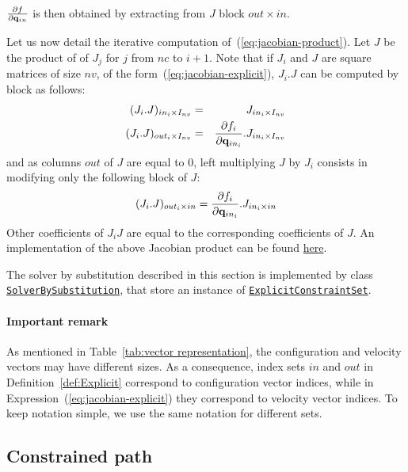 $\frac{\partial f}{\partial\mathbf{q}_{in}}$ is then obtained by extracting from $J$ block $out\times in$.

Let us now detail the iterative computation of~(\ref{eq:jacobian-product}). Let $J$ be the product of of $J_j$ for $j$ from $nc$ to $i+1$.
Note that if $J_i$ and $J$ are square matrices of size $nv$, of the form~(\ref{eq:jacobian-explicit}), $J_i.J$ can be computed by block as follows:
\begin{eqnarray*}
  (J_{i}.J)_{in_{i}\times I_{nv}} &=& J_{in_{i}\times I_{nv}}\\
  (J_{i}.J)_{out_{i}\times I_{nv}} &=& \frac{\partial f_i}{\partial\mathbf{q}_{in_{i}}}.J_{in_{i}\times I_{nv}}\\
\end{eqnarray*}
and as columns $out$ of $J$ are equal to $0$, left multiplying $J$ by $J_i$ consists in modifying only the following block of $J$:
$$
  (J_{i}.J)_{out_{i}\times in} = \frac{\partial f_i}{\partial\mathbf{q}_{in_{i}}}.J_{in_{i}\times {in}}\\
$$
Other coefficients of $J_{i}J$ are equal to the corresponding coefficients of $J$.
An implementation of the above Jacobian product can be found \href{https://github.com/humanoid-path-planner/hpp-constraints/blob/e21490c8c713949bd3038dccb6fe02cf254a615f/src/explicit-constraint-set.cc#L267}{here}.

The solver by substitution described in this section is implemented by class \href{https://gepettoweb.laas.fr/hpp/hpp-constraints/doxygen-html/classhpp_1_1constraints_1_1solver_1_1BySubstitution.html}{\texttt{SolverBySubstitution}}, that store an instance of \href{https://gepettoweb.laas.fr/hpp/hpp-constraints/doxygen-html/classhpp_1_1constraints_1_1ExplicitConstraintSet.html}{\texttt{ExplicitConstraintSet}}.

\paragraph{Important remark} As mentioned in Table~\ref{tab:vector representation}, the configuration and velocity vectors may have different sizes. As a consequence, index sets $in$ and $out$ in Definition~\ref{def:Explicit} correspond to configuration vector indices, while in Expression~(\ref{eq:jacobian-explicit}) they correspond to velocity vector indices. To keep notation simple, we use the same notation for different sets.

\subsection{Constrained path}

